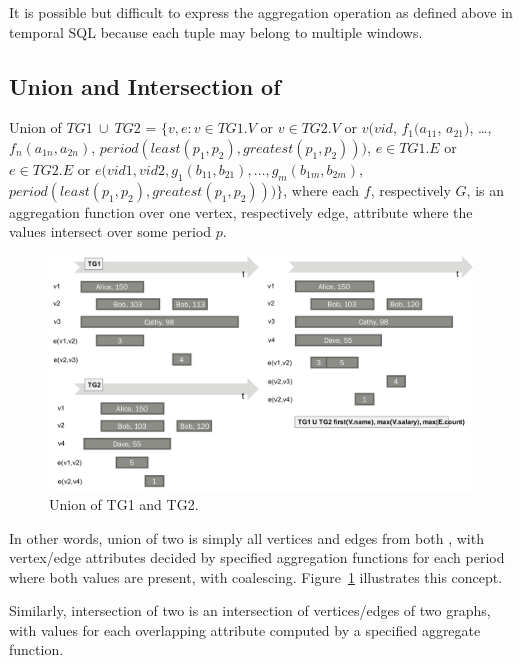 It is possible but difficult to express the aggregation operation as
defined above in temporal SQL because each tuple may belong to
multiple windows.

\subsection{Union and Intersection of \tgs}

\begin{definition}[Union]
Union of $TG1\ \cup\ TG2$ = $\{v, e: v \in TG1.V$ or $v \in TG2.V$ or
$v(vid$, $f_1(a_{11}$, $a_{21})$, \ldots, $f_n(a_{1n}, a_{2n})$,
$period(least(p_1, p_2), greatest(p_1, p_2)))$, $e \in TG1.E$ or $e
\in TG2.E$ or $e(vid1, vid2, g_1(b_{11}, b_{21}), \ldots, g_m(b_{1m},
b_{2m})$, $period(least(p_1, p_2), greatest(p_1, p_2))) \}$, where
each $f$, respectively $G$, is an aggregation function over one
vertex, respectively edge, attribute where the values intersect over
some period $p$.
\label{def:union}
\end{definition}

\begin{figure}
\includegraphics[width=6.5in]{figs/union.pdf}
\caption{Union of TG1 and TG2.}
\label{fig:union}
\end{figure}

In other words, union of two \tgs is simply all vertices and edges
from both \tgs, with vertex/edge attributes decided by specified
aggregation functions for each period where both values are present,
with coalescing.  Figure~\ref{fig:union} illustrates this concept.

Similarly, intersection of two \tgs is an intersection of
vertices/edges of two graphs, with values for each overlapping
attribute computed by a specified aggregate function.


